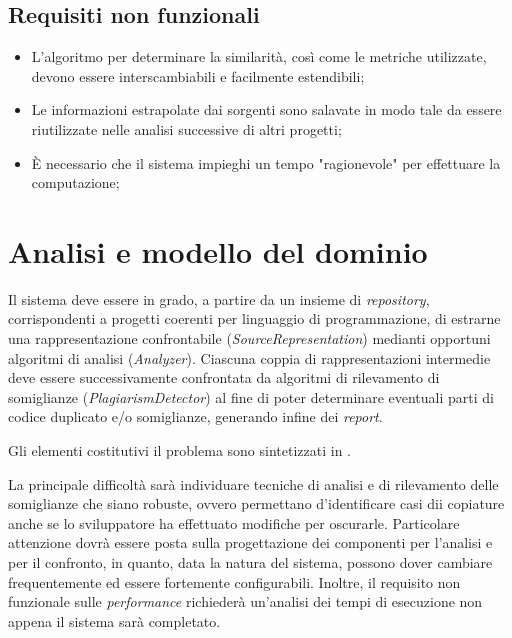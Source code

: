 \subsection*{Requisiti non funzionali}
\begin{itemize}
    \item L'algoritmo per determinare la similarità, così come le metriche utilizzate, devono essere interscambiabili e facilmente estendibili;
    \item Le informazioni estrapolate dai sorgenti sono salavate in modo tale da essere riutilizzate nelle analisi successive di altri progetti;
    \item \`E necessario che il sistema impieghi un tempo "ragionevole" per effettuare la computazione;
\end{itemize}

\section{Analisi e modello del dominio}
Il sistema deve essere in grado, a partire da un insieme di \textit{repository}, corrispondenti a progetti coerenti per linguaggio di programmazione, di estrarne una rappresentazione confrontabile (\textit{SourceRepresentation}) medianti opportuni algoritmi di analisi (\textit{Analyzer}).
%
Ciascuna coppia di rappresentazioni intermedie deve essere successivamente confrontata da algoritmi di rilevamento di somiglianze (\textit{PlagiarismDetector}) al fine di poter determinare eventuali parti di codice duplicato e/o somiglianze, generando infine dei \textit{report}.

Gli elementi costitutivi il problema sono sintetizzati in .

La principale difficoltà sarà individuare tecniche di analisi e di rilevamento delle somiglianze che siano robuste, ovvero permettano d'identificare casi dii copiature anche se lo sviluppatore ha effettuato modifiche per oscurarle.
%
Particolare attenzione dovrà essere posta sulla progettazione dei componenti per l'analisi e per il confronto, in quanto, data la natura del sistema, possono dover cambiare frequentemente ed essere fortemente configurabili.
%
Inoltre, il requisito non funzionale sulle \textit{performance} richiederà un'analisi dei tempi di esecuzione non appena il sistema sarà completato.

